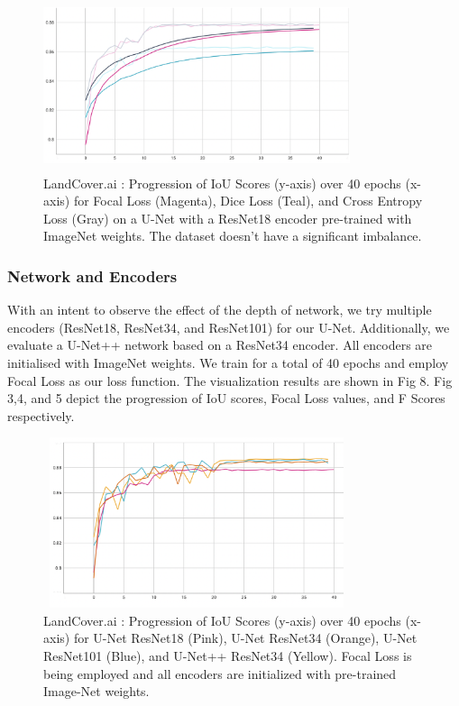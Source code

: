 \documentclass[conference]{IEEEtran}
\begin{document}
\begin{figure}[!h]
    \includegraphics[width=9cm, height=5cm]{images/roads-losses/three-losses-iou.png}
    \caption{LandCover.ai : Progression of IoU Scores (y-axis) over 40 epochs (x-axis) for Focal Loss (Magenta), Dice Loss (Teal), and Cross Entropy Loss (Gray) on a U-Net with a ResNet18 encoder pre-trained with ImageNet weights. The dataset doesn't have a significant imbalance. }
\end{figure}


\subsubsection{Network and Encoders} With an intent to observe the effect of the depth of network, we try multiple encoders (ResNet18, ResNet34, and ResNet101) for our U-Net. Additionally, we evaluate a U-Net++ network based on a ResNet34 encoder. All encoders are initialised with ImageNet weights. We train for a total of 40 epochs and employ Focal Loss as our loss function. The visualization results are shown in Fig 8. Fig 3,4, and 5 depict the progression of IoU scores, Focal Loss values, and F Scores respectively.

\begin{figure}[!h]
    \includegraphics[width=9cm, height=5cm]{images/encoders/encoders_iou.png}
    \caption{LandCover.ai : Progression of IoU Scores (y-axis) over 40 epochs (x-axis) for U-Net ResNet18 (Pink), U-Net ResNet34 (Orange), U-Net ResNet101 (Blue), and U-Net++ ResNet34 (Yellow). Focal Loss is being employed and all encoders are initialized with pre-trained Image-Net weights.}
\end{figure}
\end{document}
